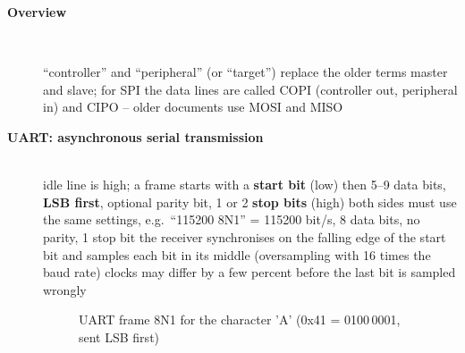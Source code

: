 \begin{description}
\item[{\rot\bf Overview}]~\\[-\lblskip]
\begin{center}
\end{center}
\bi
	\ite ``controller'' and ``peripheral'' (or ``target'') replace the older terms master and slave; for SPI the data lines are called COPI (controller out, peripheral in) and CIPO -- older documents use MOSI and MISO
\ei
\os{\newpage}

\item[{\rot\bf UART: asynchronous serial transmission}]~\\[-\lblskip]
\bi
	\ite idle line is high; a frame starts with a \textbf{start bit} (low)
	\ite then 5--9 data bits, \textbf{LSB first}, optional parity bit, 1 or 2 \textbf{stop bits} (high)
	\ite both sides must use the same settings, e.g.\ ``115200 8N1'' = 115200 bit/s, 8 data bits, no parity, 1 stop bit
	\ite the receiver synchronises on the falling edge of the start bit and samples each bit in its middle (oversampling with 16 times the baud rate)
	\bi
		\ite clocks may differ by a few percent before the last bit is sampled wrongly
	\ei
\ei
\begin{figure}[!hbtp]
\begin{center}
\caption{UART frame 8N1 for the character 'A' (0x41 = 0100\,0001, sent LSB first)}
\end{center}
\end{figure}
\os{\newpage}


\end{description}
